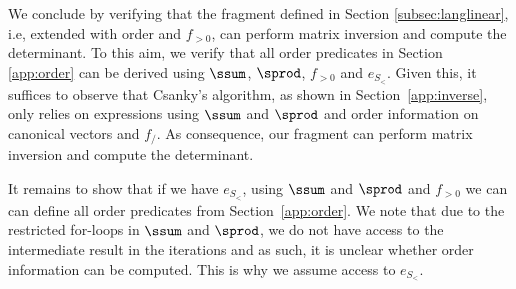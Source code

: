 
We conclude by verifying that the fragment defined in Section \ref{subsec:langlinear}, i.e, 
\langmprod extended with order and $f_{>0}$, 
can perform matrix inversion and compute the determinant. To this aim, we verify that all order
predicates in Section \ref{app:order} can be derived using $\ssum$, $\sprod$, $f_{>0}$ and 
$e_{S_{<}}$. Given this, it suffices to observe that Csanky's algorithm, as shown in Section~\ref{app:inverse}, only relies on expressions using $\ssum$ and $\sprod$ and order information on canonical vectors and $f_/$.
As consequence, our fragment can perform matrix inversion and compute the determinant.


It remains to show that if we have $e_{S_{<}}$, using $\ssum$ and $\sprod$ and $f_{>0}$ we can
can define all order predicates from Section~\ref{app:order}. We note that due to the restricted for-loops
in $\ssum$ and $\sprod$, we do not have access to the intermediate
result in the iterations and as such, it is unclear whether order information can be computed. This is why
we assume access to $e_{S_<}$.

